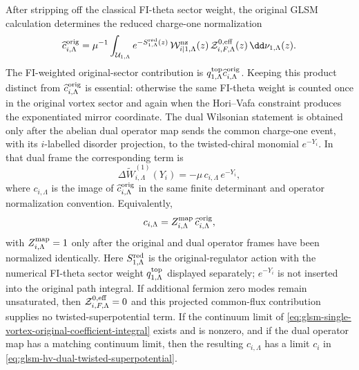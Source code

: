 \begin{proposition}
After stripping off the classical FI-theta sector weight, the original GLSM
calculation determines the reduced charge-one normalization
\begin{equation}
  \widehat c^{\rm orig}_{i,\Lambda}
  =
  \mu^{-1}
  \int_{\mathcal U_{1,\Lambda}}
  e^{-S^{\rm red}_{1,\Lambda}(z)}\,
  \mathcal W_{i|1,\Lambda}^{\rm nz}(z)\,
  \mathcal Z^{0,{\rm eff}}_{i,F,\Lambda}(z)\,
  \dd\nu_{1,\Lambda}(z).
  \label{eq:glsm-single-vortex-original-coefficient-integral}
\end{equation}
The FI-weighted original-sector contribution is
\(q^{\rm top}_{1,\Lambda}\widehat c^{\rm orig}_{i,\Lambda}\).  Keeping this
product distinct from \(\widehat c^{\rm orig}_{i,\Lambda}\) is essential:
otherwise the same FI-theta weight is counted once in the original vortex
sector and again when the Hori--Vafa constraint produces the exponentiated
mirror coordinate.
The dual Wilsonian statement is obtained only after the abelian dual
operator map sends the common charge-one event, with its \(i\)-labelled
disorder projection, to the twisted-chiral monomial \(e^{-Y_i}\).  In that dual
frame the corresponding term is
\begin{equation}
  \Delta\widetilde W_{i,\Lambda}^{(1)}(Y_i)
  =
  -\mu\,c_{i,\Lambda}\,e^{-Y_i},
  \label{eq:glsm-single-vortex-superpotential-term}
\end{equation}
where \(c_{i,\Lambda}\) is the image of
\(\widehat c^{\rm orig}_{i,\Lambda}\) in the same finite determinant and
operator normalization convention.  Equivalently,
\begin{equation}
  c_{i,\Lambda}
  =
  Z^{\rm map}_{i,\Lambda}\,\widehat c^{\rm orig}_{i,\Lambda},
  \label{eq:glsm-single-vortex-coefficient-integral}
\end{equation}
with \(Z^{\rm map}_{i,\Lambda}=1\) only after the original and dual operator
frames have been normalized identically.  Here
\(S^{\rm red}_{1,\Lambda}\) is the original-regulator action with the
numerical FI-theta sector weight \(q^{\rm top}_{1,\Lambda}\) displayed
separately; \(e^{-Y_i}\) is not inserted into the original path integral.
If additional fermion zero modes remain unsaturated, then
\(\mathcal Z^{0,{\rm eff}}_{i,F,\Lambda}=0\) and this projected common-flux
contribution supplies no twisted-superpotential term.  If the continuum limit of
\eqref{eq:glsm-single-vortex-original-coefficient-integral} exists and is
nonzero, and if the dual operator map has a matching continuum limit, then
the resulting \(c_{i,\Lambda}\) has a limit \(c_i\) in
\eqref{eq:glsm-hv-dual-twisted-superpotential}.
\end{proposition}

